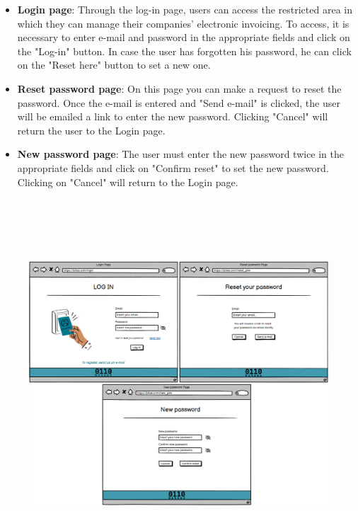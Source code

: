 \begin{itemize}
    \item \textbf{Login page}: Through the log-in page, users can access the restricted area in which they can manage their companies' electronic invoicing. To access, it is necessary to enter e-mail and password in the appropriate fields and click on the "Log-in" button.
In case the user has forgotten his password, he can click on the "Reset here" button to set a new one.
    \item \textbf{Reset password page}: On this page you can make a request to reset the password. Once the e-mail is entered and "Send e-mail" is clicked, the user will be emailed a link to enter the new password. Clicking "Cancel" will return the user to the Login page.
    \item \textbf{New password page}: The user must enter the new password twice in the appropriate fields and click on "Confirm reset" to set the new password. Clicking on "Cancel" will return to the Login page.
\end{itemize}

\begin{figure}[h!]
    \centering
    \includegraphics[height=390pt, keepaspectratio]{resources/mockup/Login.png}
\end{figure}
\newpage

